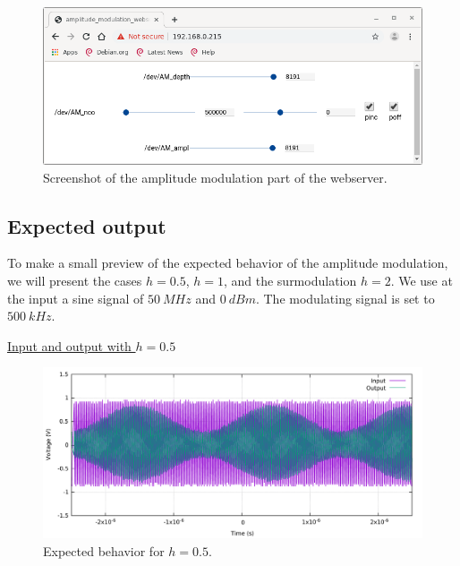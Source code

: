 \documentclass[12pt,oneside]{article}
\begin{document}
\begin{figure}[!h!tb]
	\begin{center}
		\includegraphics[width=14cm]{webserver/AM_V1.png}
		\caption{Screenshot of the amplitude modulation part of the webserver.}
		\label{fig:amplModWsv1}
	\end{center}
\end{figure}


\subsection{Expected output}

To make a small preview of the expected behavior of the amplitude modulation, we will present the cases $h=0.5$, $h=1$, and the surmodulation $h=2$. We use at the input a sine signal of $50~MHz$ and $0~dBm$. The modulating signal is set to $500~kHz$.\newline

\underline{Input and output with $h=0.5$}

\begin{figure}[!h!tb]
	\begin{center}
		\includegraphics[width=14cm]{scope/Mod_amplOkV1h05.pdf}
		\caption{Expected behavior for $h=0.5$.}
		\label{fig:ampleModV11}
	\end{center}
\end{figure}
\end{document}
